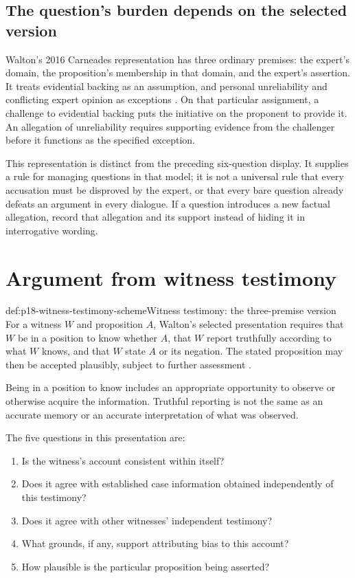 \subsection{The question's burden depends on the selected version}

Walton's 2016 Carneades representation has three ordinary premises:
the expert's domain, the proposition's membership in that domain,
and the expert's assertion. It treats evidential backing as an
assumption, and personal unreliability and conflicting expert opinion
as exceptions \cite[pp.~133--134]{Walton2016ArgumentEvaluation}.
On that particular assignment, a challenge to evidential backing puts
the initiative on the proponent to provide it. An allegation of
unreliability requires supporting evidence from the challenger before
it functions as the specified exception.

This representation is distinct from the preceding six-question display.
It supplies a rule for managing questions in that model; it is not a
universal rule that every accusation must be disproved by the expert,
or that every bare question already defeats an argument in every dialogue.
If a question introduces a new factual allegation, record that allegation
and its support instead of hiding it in interrogative wording.

\section{Argument from witness testimony}
\label{sec:p18-scheme-witness}

\begin{hbdefinition}{def:p18-witness-testimony-scheme}{Witness testimony: the three-premise version}
For a witness \(W\) and proposition \(A\), Walton's selected presentation
requires that \(W\) be in a position to know whether \(A\), that \(W\)
report truthfully according to what \(W\) knows, and that \(W\) state
\(A\) or its negation. The stated proposition may then be accepted
plausibly, subject to further assessment
\cite[pp.~271--273]{Walton2016ArgumentEvaluation}.

Being in a position to know includes an appropriate opportunity to
observe or otherwise acquire the information. Truthful reporting is
not the same as an accurate memory or an accurate interpretation of
what was observed.
\end{hbdefinition}

The five questions in this presentation are:

\begin{enumerate}
\item Is the witness's account consistent within itself?
\item Does it agree with established case information obtained
independently of this testimony?
\item Does it agree with other witnesses' independent testimony?
\item What grounds, if any, support attributing bias to this account?
\item How plausible is the particular proposition being asserted?
\end{enumerate}

